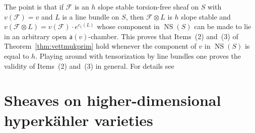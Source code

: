 \documentclass[11pt]{amsart}
\let\mathcal\mathscr
\def\cF{\mathcal{F}}
\DeclareMathOperator{\NS}{NS}
\theoremstyle{definition}
\theoremstyle{remark}
\begin{document}
The point is that if $\cF$ is an $h$ slope stable torsion-free sheaf on $S$ with $v(\cF)=v$ and $L$ is a line bundle on $S$, then $\cF\otimes L$ 
is  $h$ slope stable and $v(\cF\otimes L)=v(\cF)\cdot e^{c_1(L)}$ whose component in $\NS(S)$ can be made to lie in an arbitrary open 
${\mathsf a}(v)$-chamber. This proves that  Items~(2) and~(3) of Theorem~\ref{thm:vettmukprim} hold whenever the component of $v$ in $\NS(S)$ is equal to $h$. Playing around with tensorization by line bundles one proves the validity of Items~(2) and~(3) in general. For details 
see~\cite[Sect.~2]{og:accaduespmod}


\section{Sheaves  on higher-dimensional hyperk\"ahler varieties}\label{sec:alfinlaciccia}
%
%
\end{document}
